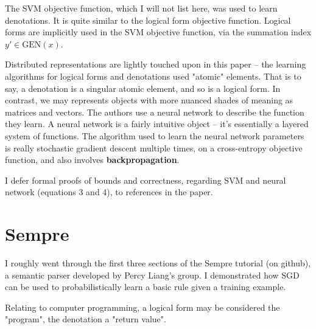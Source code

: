 \documentclass[twoside]{article}
\theoremstyle{definition}
\theoremstyle{definition}
\theoremstyle{remark}
\begin{document}
The SVM objective function, which I will not list here, was used to learn
denotations. It is quite similar to the logical form objective function. Logical
forms are implicitly used in the SVM objective function, via the summation
index $y' \in \textrm{GEN}(x)$.

Distributed representations are lightly touched upon in this paper -- the learning
algorithms for logical forms and denotations used "atomic" elements. That is to say,
a denotation is a singular atomic element, and so is a logical form. In contrast, we
may represents objects with more nuanced shades of meaning as matrices and vectors.
The authors use a neural network to describe the function they learn. A neural
network is a fairly intuitive object -- it's essentially a layered system of functions.
The algorithm used to learn the neural network parameters is really stochastic gradient
descent multiple times, on a cross-entropy objective function, and also involves
\textbf{backpropagation}.

I defer formal proofs of bounds and correctness, regarding SVM and neural network (equations 3 and 4), to references in the paper.

\section{Sempre}

I roughly went through the first three sections of the Sempre tutorial (on github), a semantic parser developed
by Percy Liang's group. I demonstrated how SGD can be used to probabilistically learn a basic rule given a training example.

Relating to computer programming, a logical form may be considered
the "program", the denotation a "return value".
\end{document}
